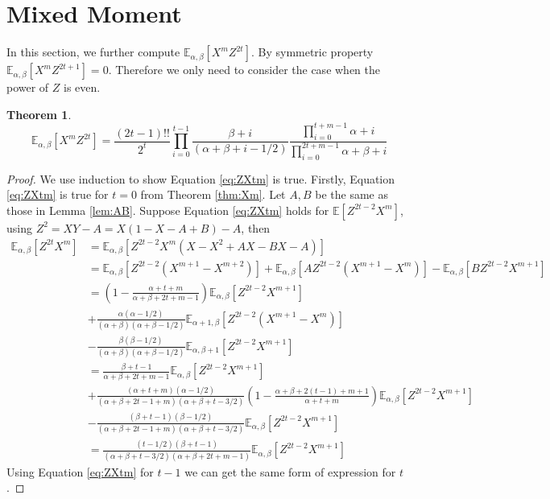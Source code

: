 \documentclass{elsarticle}
\def\E{\mathbb{E}}
\newtheorem{theorem}{Theorem}
\begin{document}
\section{Mixed Moment}
In this section, we further compute $\E_{\alpha,\beta}[X^mZ^{2t}]$.
By symmetric property  $\E_{\alpha,\beta}[X^mZ^{2t+1}] = 0$.
Therefore we only need to consider the case when the power of $Z$
is even.
\begin{theorem}\label{thm:mm}
\begin{equation}\label{eq:ZXtm}
\E_{\alpha, \beta}[X^mZ^{2t}] = \frac{(2t-1)!!}{2^t}
\prod_{i=0}^{t-1}
\frac{\beta+i}{(\alpha+\beta+i-1/2)}
\frac{\prod_{i=0}^{t+m-1}\alpha+i}{\prod_{i=0}^{2t+m-1}
\alpha+\beta+i}
\end{equation}
\end{theorem}
\begin{proof}
We use induction to show Equation \eqref{eq:ZXtm} is true.
Firstly, Equation \eqref{eq:ZXtm} is true for $t=0$ from 
Theorem \ref{thm:Xm}. Let $A, B$ be the same as those
in Lemma \ref{lem:AB}.
Suppose Equation \eqref{eq:ZXtm} holds for $\E[Z^{2t-2}X^m]$,
using $Z^2=XY-A=X(1-X-A+B)-A$, then
\begin{align*}
\E_{\alpha,\beta}[Z^{2t}X^m] &=
\E_{\alpha,\beta}[Z^{2t-2}X^m(X-X^2+AX-BX-A)] \\
&= \E_{\alpha,\beta}[Z^{2t-2}(X^{m+1} - X^{m+2})] +
\E_{\alpha,\beta}[A Z^{2t-2} (X^{m+1} - X^m)] -
\E_{\alpha,\beta}[BZ^{2t-2} X^{m+1}] \\
&= \left(1-\frac{\alpha+t+m}{\alpha+\beta+2t+m-1}
\right)\E_{\alpha, \beta}[Z^{2t-2}X^{m+1}] \\
&+
\frac{\alpha(\alpha-1/2)}{(\alpha+\beta)(\alpha+\beta-1/2)}
\E_{\alpha+1,\beta}[Z^{2t-2}(X^{m+1} - X^m)] \\
&-\frac{\beta(\beta-1/2)}{(\alpha+\beta)(\alpha+\beta-1/2)}
\E_{\alpha,\beta+1}[Z^{2t-2}X^{m+1}]\\
&=\frac{\beta+t-1}{\alpha+\beta + 2t+m-1}
\E_{\alpha,\beta}[Z^{2t-2}X^{m+1}] \\
&+\frac{(\alpha+t+m)(\alpha-1/2)}{(\alpha+\beta+2t-1+m)(\alpha+\beta + t - 3/2)}
\left(1-\frac{\alpha+\beta+2(t-1)+m+1}{\alpha+t+m}\right)
\E_{\alpha, \beta}[Z^{2t-2}X^{m+1}] \\
&-\frac{(\beta+t-1)(\beta-1/2)}{(\alpha+\beta+2t-1+m)(\alpha+\beta + t - 3/2)}
\E_{\alpha,\beta}[Z^{2t-2}X^{m+1}]\\
&=\frac{(t-1/2)(\beta+t-1)}{(\alpha+\beta+t-3/2)(\alpha+\beta+2t+m-1)}
\E_{\alpha, \beta}[Z^{2t-2}X^{m+1}]
\end{align*}
Using Equation \eqref{eq:ZXtm} for $t-1$
we can get the same form of expression for $t$.
\end{proof}
\end{document}
